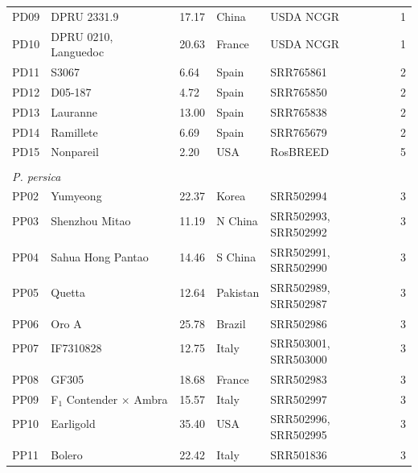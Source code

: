 \documentclass[12pt]{article}
\begin{document}
\begin{center}
\begin{longtable}{lllllc}
	PD09 &DPRU 2331.9 &17.17 &China &USDA NCGR &1\\
	PD10 &DPRU 0210, Languedoc &20.63 &France &USDA NCGR &1\\
	PD11 &S3067 &6.64 &Spain &SRR765861 &2\\
	PD12 &D05-187 &4.72 &Spain &SRR765850 &2\\
	PD13 &Lauranne &13.00 &Spain &SRR765838 &2\\
	PD14 &Ramillete &6.69 &Spain &SRR765679 &2\\
	PD15 &Nonpareil &2.20 & USA&RosBREED &5\\
	\\
	\multicolumn{6}{l}{\emph{P. persica}}  \\ %
	PP02 &Yumyeong &22.37 &Korea &SRR502994 &3\\
	PP03 &Shenzhou Mitao &11.19 &N China &
	\multirow{2}{1cm}{SRR502993, SRR502992} &3\\
	\\
	PP04 &Sahua Hong Pantao &14.46 &S China &
	\multirow{2}{1cm}{SRR502991, SRR502990} &3\\
	\\
	PP05 &Quetta &12.64 &Pakistan &
	\multirow{2}{1cm}{SRR502989, SRR502987} &3\\
	\\
	PP06 &Oro A &25.78 &Brazil &SRR502986 &3\\
	PP07 &IF7310828 &12.75 &Italy &
	\multirow{2}{2cm}{SRR503001, SRR503000} &3\\
	\\
	PP08 &GF305 &18.68 &France &SRR502983 &3\\
	PP09 &F$_{1}$ Contender $\times$ Ambra &15.57 &Italy &SRR502997 &3\\
	PP10 &Earligold &35.40 &USA &
	\multirow{2}{1cm}{SRR502996, SRR502995} &3\\
	\\
	PP11 &Bolero &22.42 &Italy &SRR501836 &3\\

\end{longtable}
\end{center}
\end{document}
